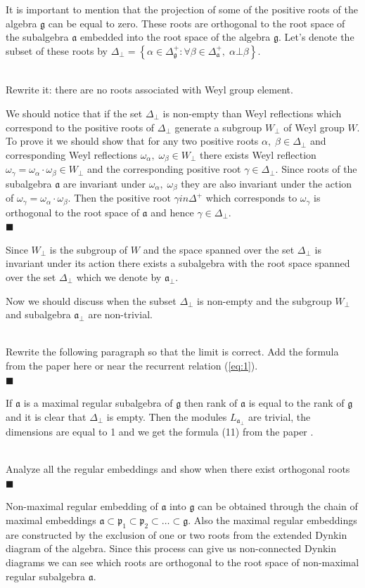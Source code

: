 \documentclass[a4paper,12pt]{article}
\theoremstyle{definition} \newtheorem{Def}{Definition}
\newenvironment{comment}
{\par\noindent{\bf TODO}\\}
{\\\hfill$\scriptstyle\blacksquare$\par}
\begin{document}
It is important to mention that the projection of some of the positive roots of the algebra $\mathfrak{g}$ can be equal to zero. These roots are orthogonal to the root space of the subalgebra $\mathfrak{a}$ embedded into the root space of the algebra $\mathfrak{g}$. Let's denote the subset of these roots by $\Delta_{\bot}=\left\{\alpha\in\Delta_{\mathfrak{g}}^{+}:\forall \beta\in \Delta_{\mathfrak{a}}^{+},\; \alpha\bot\beta \right\}$.
\begin{comment}
  Rewrite it: there are no roots associated with Weyl group element.

We should notice that if the set $\Delta_{\bot}$ is non-empty than Weyl reflections which correspond to the positive roots of $\Delta_{\bot}$ generate a subgroup $W_{\bot}$ of Weyl group $W$. To prove it we should show that for any two positive roots $\alpha,\; \beta\in \Delta_{\bot}$ and corresponding Weyl reflections $\omega_{\alpha},\; \omega_{\beta}\in W_{\bot}$ there exists Weyl reflection $\omega_{\gamma}=\omega_{\alpha}\cdot \omega_{\beta}\in W_{\bot}$ and the corresponding positive root $\gamma\in \Delta_{\bot}$. Since roots of the subalgebra $\mathfrak{a}$ are invariant under $\omega_{\alpha}, \; \omega_{\beta}$ they are also invariant under the action of $\omega_{\gamma}=\omega_{\alpha}\cdot \omega_{\beta}$. Then the positive root $\gamma in \Delta^{+}$ which corresponds to $\omega_{\gamma}$ is orthogonal to the root space of $\mathfrak{a}$ and hence $\gamma\in \Delta_{\bot}$. 
\end{comment}
Since $W_{\bot}$ is the subgroup of $W$ and the space spanned over the set $\Delta_{\bot}$ is invariant under its action there exists a  subalgebra with the root space spanned over the set $\Delta_{\bot}$ which we denote by $\mathfrak{a}_{\bot}$.

Now we should discuss when the subset $\Delta_{\bot}$ is non-empty and the subgroup $W_{\bot}$ and subalgebra $\mathfrak{a}_{\bot}$ are non-trivial.
\begin{comment}
  Rewrite the following paragraph so that the limit is correct. Add the formula from the paper \cite{ilyin812pbc} here or near the recurrent relation (\ref{eq:1}).
\end{comment}
If $\mathfrak{a}$ is a maximal regular subalgebra of $\mathfrak{g}$ then rank of $\mathfrak{a}$ is equal to the rank of $\mathfrak{g}$ and it is clear that $\Delta_{\bot}$ is empty.
Then the modules $L_{\mathfrak{a}_{\bot}}$ are trivial, the dimensions are equal to 1 and we get the formula (11) from the paper \cite{ilyin812pbc}.
\begin{comment}
  Analyze all the regular embeddings and show when there exist orthogonal roots 
\end{comment}
Non-maximal regular embedding of $\mathfrak{a}$ into $\mathfrak{g}$ can be obtained through the chain of maximal embeddings $\mathfrak{a}\subset \mathfrak{p}_1\subset \mathfrak{p}_2\subset\dots \subset \mathfrak{g}$. Also the maximal regular embeddings are constructed by the exclusion of one or two roots from the extended Dynkin diagram of the algebra. Since this process can give us non-connected Dynkin diagrams we can see which roots are orthogonal to the root space of non-maximal regular subalgebra $\mathfrak{a}$. 
\end{document}
